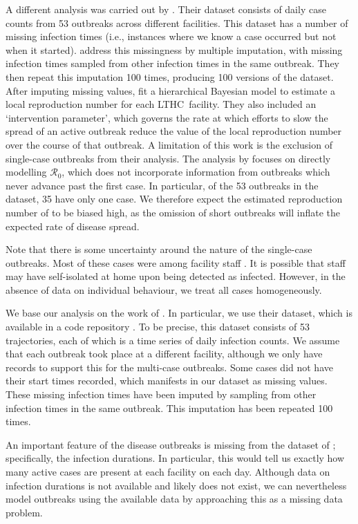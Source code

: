 \documentclass[11pt, oneside]{article}   	%
\newcommand{\lt}{LTHC}
\begin{document}
A different analysis was carried out by \citet{Sto22}. Their dataset consists of daily case counts from 53 outbreaks across different facilities. This dataset has a number of missing infection times (i.e., instances where we know a case occurred but not when it started). \citeauthor{Sto22} address this missingness by multiple imputation, with missing infection times sampled from other infection times in the same outbreak. They then repeat this imputation 100 times, producing 100 versions of the dataset. After imputing missing values, \citeauthor{Sto22} fit a hierarchical Bayesian model to estimate a local reproduction number for each \lt\ facility. They also included an `intervention parameter', which governs the rate at which efforts to slow the spread of an active outbreak reduce the value of the local reproduction number over the course of that outbreak. A limitation of this work is the exclusion of single-case outbreaks from their analysis. The analysis by \citet{Sto22} focuses on directly modelling $\mathscr{R}_0$, which does not incorporate information from outbreaks which never advance past the first case. In particular, of the 53 outbreaks in the dataset, 35 have only one case. We therefore expect the estimated reproduction number of \citeauthor{Sto22} to be biased high, as the omission of short outbreaks will inflate the expected rate of disease spread.

Note that there is some uncertainty around the nature of the single-case outbreaks. Most of these cases were among facility staff \citep[see Supplemental Material to][]{Sto22}. It is possible that staff may have self-isolated at home upon being detected as infected. However, in the absence of data on individual behaviour, we treat all cases homogeneously.

We base our analysis on the work of \citet{Sto22}. In particular, we use their dataset, which is available in a code repository \citep{Irv23}. To be precise, this dataset consists of 53 trajectories, each of which is a time series of daily infection counts. We assume that each outbreak took place at a different facility, although we only have records to support this for the multi-case outbreaks. Some cases did not have their start times recorded, which manifests in our dataset as missing values. These missing infection times have been imputed by sampling from other infection times in the same outbreak. This imputation has been repeated 100 times. 

An important feature of the disease outbreaks is missing from the dataset of \citet{Sto22}; specifically, the infection durations. In particular, this would tell us exactly how many active cases are present at each facility on each day. Although data on infection durations is not available and likely does not exist, we can nevertheless model outbreaks using the available data by approaching this as a missing data problem.
\end{document}
